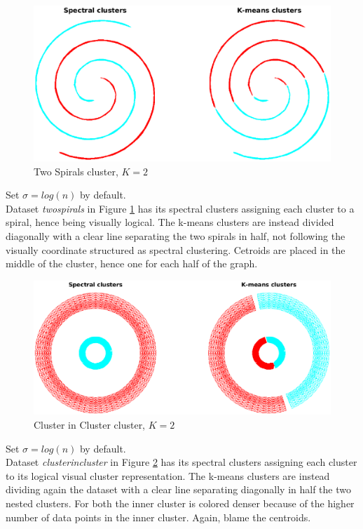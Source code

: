 \documentclass[unicode,11pt,a4paper,oneside,numbers=endperiod,openany]{scrartcl}
\begin{document}
\begin{figure}[H]
    \centering
    \caption{Two Spirals cluster, $K=2$}
    \label{fig:ex1-7-twospirals}
    \includegraphics[width=\textwidth, trim={3cm 1cm 3cm 0cm}]{./img/ex1-7-twospirals.eps}
\end{figure}

Set $\sigma=log(n)$ by default.\\
Dataset \textit{twospirals} in Figure \ref{fig:ex1-7-twospirals} has its spectral clusters
assigning each cluster to a spiral, hence being visually logical.
The k-means clusters are instead divided diagonally with a clear line separating the two spirals
in half, not following the visually coordinate structured as spectral clustering.
Cetroids are placed in the middle of the cluster, hence one for each half of the graph.

\begin{figure}[H]
    \centering
    \caption{Cluster in Cluster cluster, $K=2$}
    \label{fig:ex1-7-clusterincluster}
    \includegraphics[width=\textwidth, trim={3cm 1cm 3cm 0cm}]{./img/ex1-7-clusterincluster.eps}
\end{figure}

Set $\sigma=log(n)$ by default.\\
Dataset \textit{clusterincluster} in Figure \ref{fig:ex1-7-clusterincluster} has its spectral clusters
assigning each cluster to its logical visual cluster representation.
The k-means clusters are instead dividing again the dataset with a clear line separating diagonally
in half the two nested clusters.
For both the inner cluster is colored denser because of the higher number of data points in the
inner cluster.
Again, blame the centroids.
\end{document}
